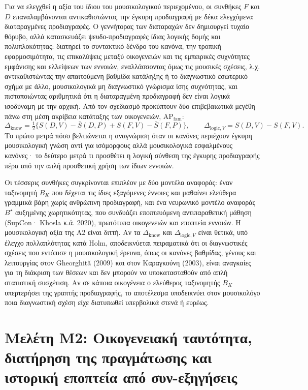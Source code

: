 \documentclass[11pt,a4paper]{article}
\begin{document}
Για να ελεγχθεί η αξία του ίδιου του μουσικολογικού περιεχομένου, οι συνθήκες $F$ και $D$ επαναλαμβάνονται αντικαθιστώντας την έγκυρη προδιαγραφή με δέκα ελεγχόμενα διαταραγμένες προδιαγραφές. Ο γεννήτορας των διαταραχών δεν δημιουργεί τυχαίο θόρυβο, αλλά κατασκευάζει ψευδο-προδιαγραφές ίδιας λογικής δομής και πολυπλοκότητας: διατηρεί το συντακτικό δένδρο του κανόνα, την τροπική εφαρμοσιμότητα, τις επικαλύψεις μεταξύ οικογενειών και τις εμπειρικές συχνότητες εμφάνισης και ελλείψεων των εννοιών, εναλλάσσοντας όμως τις μουσικές σχέσεις, λ.χ. αντικαθιστώντας την απαιτούμενη βαθμίδα κατάληξης ή το διαγνωστικό εσωτερικό σχήμα με άλλο, μουσικολογικά μη διαγνωστικό γνώρισμα ίσης συχνότητας, και πιστοποιώντας αριθμητικά ότι η διαταραγμένη προδιαγραφή δεν είναι λογικά ισοδύναμη με την αρχική. Από τον σχεδιασμό προκύπτουν δύο επιβεβαιωτικά μεγέθη πάνω στη μέση ακρίβεια κατάταξης των οικογενειών, $\mathrm{AP}_{\text{fam}}$:
\[
\Delta_{\text{know}}=\tfrac12\bigl\{S(D,V)-\bar S(D,P)+S(F,V)-\bar S(F,P)\bigr\},\qquad
\Delta_{\text{logic},V}=S(D,V)-S(F,V).
\]
Το πρώτο μετρά πόσο βελτιώνεται η αναγνώριση όταν οι κανόνες περιέχουν έγκυρη μουσικολογική γνώση αντί για ισόμορφους αλλά μουσικολογικά εσφαλμένους κανόνες· το δεύτερο μετρά τι προσθέτει η λογική σύνθεση της έγκυρης προδιαγραφής πέρα από την απλή προσθετική χρήση των ίδιων εννοιών.

Οι τέσσερις συνθήκες συγκρίνονται επιπλέον με δύο μοντέλα αναφοράς: έναν ταξινομητή $B_K$ που δέχεται τις ίδιες εξαγόμενες έννοιες και μαθαίνει ελεύθερα γραμμικά βάρη χωρίς ανθρώπινη προδιαγραφή, και ένα νευρωνικό μοντέλο αναφοράς $B^{\star}$ αυξημένης χωρητικότητας, που συνδυάζει εποπτευόμενη αντιπαραθετική μάθηση (SupCon· Khosla κ.ά. 2020), πρωτότυπα οικογενειών και εποπτεία εννοιών. Η μουσικολογική αξία της Α2 είναι διττή. Αν τα $\Delta_{\text{know}}$ και $\Delta_{\text{logic},V}$ είναι θετικά, υπό έλεγχο πολλαπλότητας κατά Holm, αποδεικνύεται πειραματικά ότι οι διαγνωστικές σχέσεις που εντόπισε η μουσικολογική έρευνα, όπως οι κανόνες βαθμίδας, γένους και λειτουργίας στον Gheorghiță (2009) και στον Καραγκούνη (2003), είναι αναγκαίες για τη διάκριση των θέσεων και δεν μπορούν να υποκατασταθούν από απλή στατιστική συσχέτιση. Αν σε κάποια οικογένεια ο ελεύθερος ταξινομητής $B_K$ υπερτερήσει της γραπτής προδιαγραφής, το αποτέλεσμα υποδεικνύει στον μουσικολόγο ποια διαγνωστική σχέση είχε διατυπωθεί υπερβολικά στενά ή ευρέως.

\section{Μελέτη Μ2: Οικογενειακή ταυτότητα, διατήρηση της πραγμάτωσης και ιστορική εποπτεία από συν-εξηγήσεις}
\end{document}
